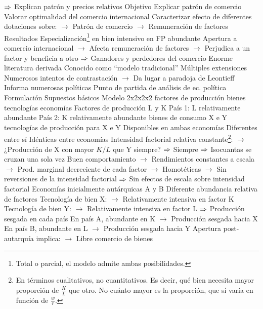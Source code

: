 \documentclass{nuevotema}
\begin{document}
\begin{esquemal}
				\4[] $\Rightarrow$ Explican patrón y precios relativos
			\3 Objetivo
				\4 Explicar patrón de comercio
				\4 Valorar optimalidad del comercio internacional
				\4 Caracterizar efecto de diferentes dotaciones sobre:
				\4[] $\to$ Patrón de comercio
				\4[] $\to$ Remuneración de factores
			\3 Resultados
				\4 Especialización\footnote{Total o parcial, el modelo admite ambas posibilidades.} en bien intensivo en FP abundante
				\4 Apertura a comercio internacional
				\4[] $\to$ Afecta remuneración de factores
				\4[] $\to$ Perjudica a un factor y beneficia a otro
				\4[] $\Rightarrow$ Ganadores y perdedores del comercio
				\4 Enorme literatura derivada
				\4[] Conocido como ``modelo tradicional''
				\4[] Múltiples extensiones
				\4[] Numerosos intentos de contrastación
				\4[] $\to$ Da lugar a paradoja de Leontieff
				\4 Informa numerosas políticas
				\4[] Punto de partida de análisis de ec. política
		\2 Formulación
			\3 Supuestos básicos
				\4 Modelo 2x2x2x2
				 factores de producción
				 bienes
				\4[] 2 tecnologías
				 economías
				\4 Factores de producción
				\4[] L y K
				\4[] País 1: L relativamente abundante
				\4[] País 2: K relativamente abundante
				 bienes de consumo
				\4[] X e Y
				 tecnologías de producción para X e Y
				\4[] Disponibles en ambas economías
				\4[] Diferentes entre sí
				\4[] Idénticas entre economías
				\4[] Intensidad factorial relativa constante\footnote{En términos cualitativos, no cuantitativos. Es decir, qué bien necesita mayor proporción de $\frac{K}{L}$ que otro. No cuánto mayor es la proporción, que sí varía en función de $\frac{w}{r}$.}:
				\4[] $\to$ ¿Producción de X con mayor $K/L$ que Y siempre?
				\4[] $\Rightarrow$ Siempre
				\4[] $\Rightarrow$ Isocuantas se cruzan una sola vez
				\4[] Buen comportamiento
				\4[] $\to$ Rendimientos constantes a escala
				\4[] $\to$ Prod. marginal decreciente de cada factor
				\4[] $\to$ Homotéticas
				\4[] $\to$ Sin reversiones de la intensidad factorial
				\4[] $\Rightarrow$ Sin efectos de escala sobre intensidad factorial
				\4 Economías inicialmente autárquicas
				\4[] A y B
				\4[] Diferente abundancia relativa de factores
				\4 Tecnología de bien X:
				\4[] $\to$ Relativamente intensiva en factor K
				\4 Tecnología de bien Y:
				\4[] $\to$ Relativamente intensiva en factor L
				\4[] $\Rightarrow$ Producción sesgada en cada país
				\4 En país A, abundante en K
				\4[] $\to$ Producción sesgada hacia X
				\4 En país B, abundante en L
				\4[] $\to$ Producción sesgada hacia Y
				\4 Apertura post-autarquía implica:
				\4[] $\to$ Libre comercio de bienes

\end{esquemal}
\end{document}
